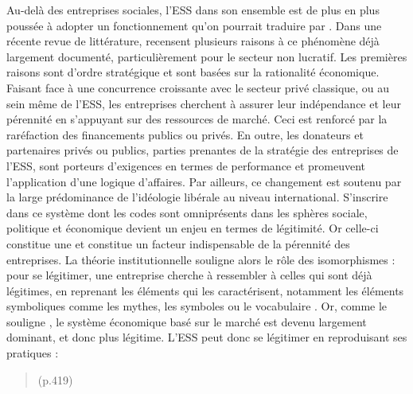             Au-delà des entreprises sociales, l’ESS dans son ensemble est de plus en plus poussée à adopter un fonctionnement   \parencite{dart2004being} qu’on pourrait traduire par . Dans une récente revue de littérature, \textcite{maier2016nonprofit} recensent plusieurs raisons à ce phénomène déjà largement documenté, particulièrement pour le secteur non lucratif. Les premières raisons sont d’ordre stratégique et sont basées sur la rationalité économique. Faisant face à une concurrence croissante avec le secteur privé classique, ou au sein même de l’ESS, les entreprises cherchent à assurer leur indépendance et leur pérennité en s’appuyant sur des ressources de marché. Ceci est renforcé par la raréfaction des financements publics ou privés. En outre, les donateurs et partenaires privés ou publics, parties prenantes de la stratégie des entreprises de l’ESS, sont porteurs d’exigences en termes de performance et promeuvent l’application d’une logique d’affaires. Par ailleurs, ce changement est soutenu par la large prédominance de l’idéologie libérale au niveau international. S’inscrire dans ce système dont les codes sont omniprésents dans les sphères sociale, politique et économique devient un enjeu en termes de légitimité. Or celle-ci constitue une  \parencite{suchman1995managing} et constitue un facteur indispensable de la pérennité des entreprises. La théorie institutionnelle souligne alors le rôle des isomorphismes : pour se légitimer, une entreprise cherche à ressembler à celles qui sont déjà légitimes, en reprenant les éléments qui les caractérisent, notamment les éléments symboliques comme les mythes, les symboles ou le vocabulaire \parencite{dimaggio2010iron, meyer1977institutionalized}. Or, comme le souligne \textcite{dart2004legitimacy}, le système économique basé sur le marché est devenu largement dominant, et donc plus légitime. L’ESS peut donc se légitimer en reproduisant ses pratiques :
            \begin{quotation}
                 (p.419)
            \end{quotation}

